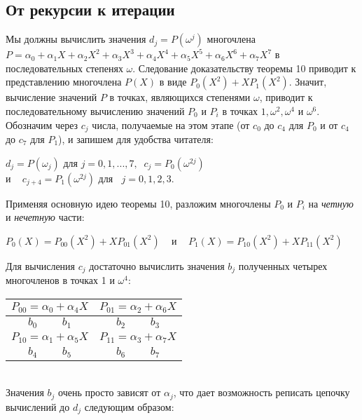 \documentclass{mai_book}
\begin{document}
\subsection{ От рекурсии к итерации}
Мы должны вычислить значения $d_j = P(\omega^j)$ многочлена $P=\alpha_0+\alpha_1X+\alpha_2X^2+\alpha_3X^3+\alpha_4X^4+\alpha_5X^5+\alpha_6X^6+\alpha_7X^7$ в 
последовательных степенях $\omega$. Следование доказательству теоремы 10 приводит к
представлению многочлена $P(X)$ в виде $P_0(X^2)+XP_1(X^2)$. Значит,
вычисление значений $P$ в точках, являющихся степенями $\omega$, приводит
к последовательному вычислению значений $P_0$ и $P_i$ в точках $1,\omega^2,\omega^4$
и $\omega^6$. Обозначим через $c_j$ числа, получаемые на этом этапе (от $c_0$ до $c_4$
для $P_0$ и от $c_4$ до $c_7$ для $P_1$), и запишем для удобства читателя:\\
\begin{center}
$d_j=P(\omega_j)$ для $j=0,1,...,7,\;\;c_j=P_0(\omega^{2j})$\\
и $\;\;\;c_{j+4} = P_1(\omega^{2j})$ для $\;\;j=0,1,2,3.$  
\end{center}
Применяя основную идею теоремы 10, разложим многочлены $P_0$ и $P_i$
на \textit{четную} и \textit{нечетную} части:
\begin{center}
$P_0(X)=P_{00}(X^2)+XP_{01}(X^2)\;\;\;$ и $\;\;\;P_1(X)=P_{10}(X^2)+XP_{11}(X^2)$
\end{center}
Для вычисления $c_j$ достаточно вычислить значения $b_j$ полученных 
четырех многочленов в точках 1 и $\omega^4$:\\
\begin{table}[h]
\begin{center}
\begin{tabular}{|c|c|}
\hline
$P_{00}=\alpha_0 + \alpha_4X$ & $P_{01}=\alpha_2 + \alpha_6X$\\
\hline
$b_0\;\;\;\;\;\;\;\; b_1$ & $b_2\;\;\;\;\;\;\;\; b_3$\\
\hline
$P_{10}=\alpha_1 + \alpha_5X$ & $P_{11}=\alpha_3 + \alpha_7X$ \\
\hline
$b_4\;\;\;\;\;\;\;\; b_5$ & $b_6\;\;\;\;\;\;\;\; b_7$\\
\hline
\end{tabular}
\end{center}
\end{table}
\\
Значения $b_j$ очень просто зависят от $\alpha_j$, что дает возможность 
реписать цепочку вычислений до $d_j$ следующим образом:\\
\end{document}
